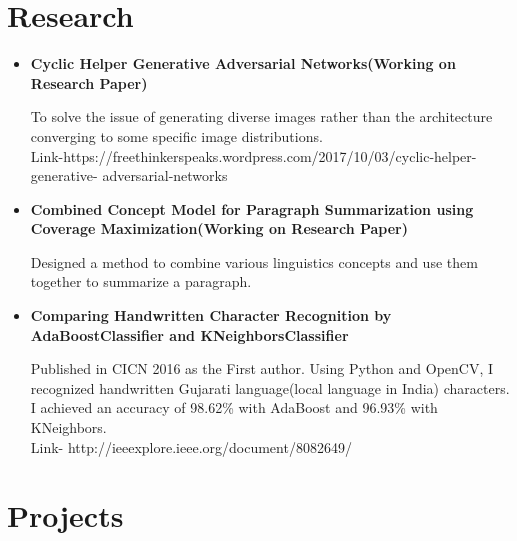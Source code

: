 \documentclass[11pt,a4paper,sans]{moderncv}        %
\begin{document}
\vspace{2pt}

\section{Research}

\vspace{3pt}

\begin{itemize}

\item{\textbf{Cyclic Helper Generative Adversarial Networks(Working on Research Paper)} 

\vspace{2pt}

\small{To solve the issue of generating diverse images rather than the architecture converging to some specific image distributions.\\Link-https://freethinkerspeaks.wordpress.com/2017/10/03/cyclic-helper-generative- adversarial-networks}}
\vspace{3pt}

\item{\textbf{Combined Concept Model for Paragraph Summarization using Coverage Maximization(Working on Research Paper)} 

\vspace{2pt}

\small{Designed a method to combine various linguistics concepts and use them together to summarize a paragraph.}}

\vspace{3pt}

\item{\textbf{Comparing Handwritten Character Recognition by AdaBoostClassifier and KNeighborsClassifier}

\vspace{2pt}

\small{Published in CICN 2016 as the First author. Using Python and OpenCV, I recognized handwritten Gujarati language(local language in India) characters. I achieved an accuracy of 98.62\% with AdaBoost and 96.93\% with KNeighbors.  \\Link- http://ieeexplore.ieee.org/document/8082649/}}

\end{itemize}

\vspace{2pt}

\section{Projects}
\end{document}
